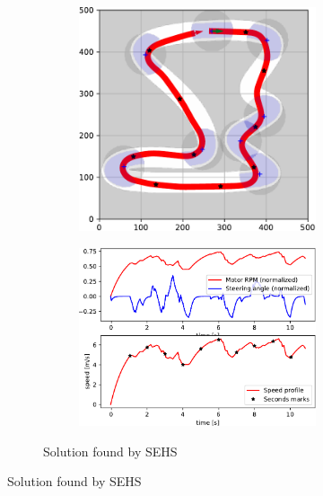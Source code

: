 \begin{figure}[!tbp]
	\vspace{0.75cm}
	
	\begin{subfigure}[t]{\textwidth}
		\begin{subfigure}[c]{0.54\textwidth}
			\includegraphics[width=\textwidth]{../img/experiments/tornado-sehs-trajectory}
		\end{subfigure}
		\hfill
		\begin{subfigure}[c]{0.45\textwidth}
			\includegraphics[width=\textwidth]{../img/experiments/tornado-sehs-actuators}
		\end{subfigure}
		\caption{Solution found by SEHS}
		\label{fig:solution_tornado-sehs}
	\end{subfigure}
	

\end{figure}

